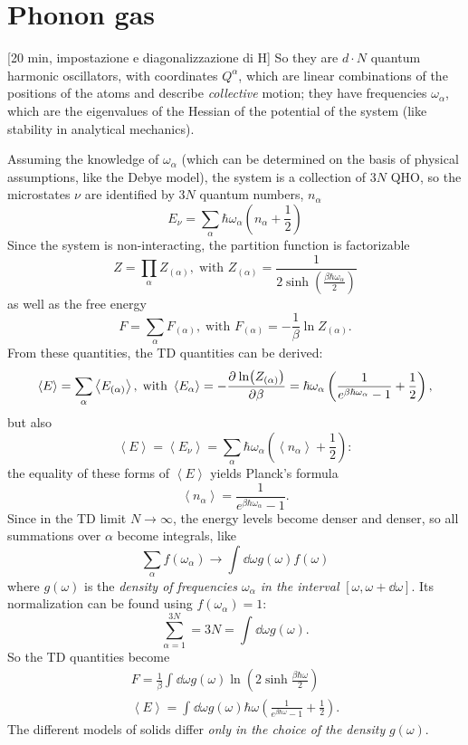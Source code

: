 
\section{Phonon gas}
[20 min, impostazione e diagonalizzazione di H]
So they are $d\cdot N$ quantum harmonic oscillators, with coordinates $Q^\alpha$,
which are linear combinations of the positions of the atoms and describe
\textit{collective} motion; they have frequencies $\omega_\alpha$, which
are the eigenvalues of the Hessian of the potential of the system (like stability
in analytical mechanics).

Assuming the knowledge of $\omega_\alpha$ (which can be determined on the basis
of physical assumptions, like the Debye model), the system is a collection of
$3N$ QHO, so the microstates $\nu$ are identified by $3N$ quantum numbers,
$n_\alpha$
\[
    E_\nu = \sum_{\alpha}^{} \hbar \omega_\alpha\left(n_\alpha+\frac{1}{2}\right)
\]
Since the system is non-interacting, the partition function is factorizable
\[
    Z=\prod_{\alpha}^{} Z_{(\alpha)},\;\text{with } Z_{(\alpha)} = \frac{1}{
    2\sinh\left(\frac{\beta\hbar\omega_\alpha}{2}\right)}
\]
as well as the free energy
\[
    F=\sum_{\alpha}^{} F_{(\alpha)},\;\text{with }F_{(\alpha)} = -\frac{1}{\beta}
    \ln Z_{(\alpha)}.
\]
From these quantities, the TD quantities can be derived:
\[
    \left\langle E\right\rangle = \sum_{\alpha}^{} \left\langle E_{(\alpha)}
    \right\rangle,\;\text{with }\left\langle E_{\alpha}\right\rangle = -\pdv[]{\ln
    (Z_{(\alpha)})}{\beta} = \hbar\omega_\alpha\left(\frac{1}{e^{\beta
    \hbar\omega_\alpha}-1}+\frac{1}{2}\right),
\]
but also
\[
    \left\langle E\right\rangle =\left\langle E_\nu\right\rangle = \sum_{\alpha}
    \hbar \omega_\alpha\left(\left\langle n_\alpha\right\rangle +\frac{1}{2}
    \right):
\]
the equality of these forms of $\left\langle E\right\rangle $ yields Planck's
formula
\[
    \left\langle n_\alpha\right\rangle =\frac{1}{e^{\beta\hbar\omega_\alpha}-1}.
\]
Since in the TD limit $N\to\infty$, the energy levels become denser and denser, so
all summations over $\alpha$ become integrals, like
\[
    \sum_{\alpha}^{} f(\omega_\alpha)\to\int_{}^{} \dd\omega g(\omega)f(\omega)
\]
where $g(\omega)$ is the \textit{density of frequencies $\omega_\alpha$ in the 
interval} $\left[\omega,\omega+\dd\omega\right]$. Its normalization
can be found using $f(\omega_\alpha)=1$:
\[
    \sum_{\alpha=1}^{3N} = 3N=\int_{}^{} \dd\omega g(\omega).
\]
So the TD quantities become
\begin{gather*}
    F = \frac{1}{\beta}\int_{}^{} \dd\omega g(\omega)\ln\left(2\sinh\frac{
    \beta\hbar\omega}{2}\right)\\
    \left\langle E\right\rangle =
    \int_{}^{} \dd\omega g(\omega) \hbar\omega\left(\frac{1}{e^{\beta\hbar\omega}
    -1}+\frac{1}{2}\right).
\end{gather*}
The different models of solids differ \textit{only in the choice of the density}
$g(\omega)$.

